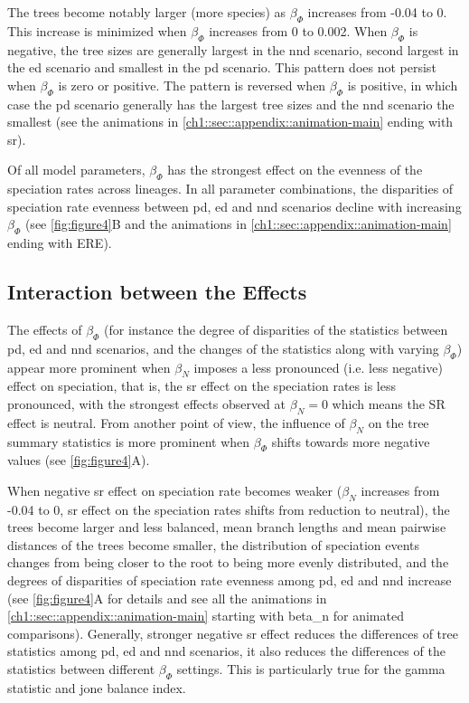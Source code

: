 {The trees become notably larger (more species) as $\beta_\varPhi$ increases from -0.04 to 0. This increase is minimized when $\beta_\varPhi$ increases from 0 to 0.002. When $\beta_\varPhi$ is negative, the tree sizes are generally largest in the \acrshort{nnd} scenario, second largest in the \acrshort{ed} scenario and smallest in the \acrshort{pd} scenario. This pattern does not persist when $\beta_\varPhi$ is zero or positive. The pattern is reversed when $\beta_\varPhi$ is positive, in which case the \acrshort{pd} scenario generally has the largest tree sizes and the \acrshort{nnd} scenario the smallest (see the animations in \autoref{ch1::sec::appendix::animation-main} ending with \acrshort{sr}).

Of all model parameters, $\beta_\varPhi$ has the strongest effect on the evenness of the speciation rates across lineages. In all parameter combinations, the disparities of speciation rate evenness between \acrshort{pd}, \acrshort{ed} and \acrshort{nnd} scenarios decline with increasing $\beta_\varPhi$ (see \autoref{fig:figure4}B and the animations in \autoref{ch1::sec::appendix::animation-main} ending with ERE). 

\subsection{Interaction between the Effects}
\label{ch1::sec::results::interaction_er_sr}
The effects of $\beta_\varPhi$ (for instance the degree of disparities of the statistics between \acrshort{pd}, \acrshort{ed} and \acrshort{nnd} scenarios, and the changes of the statistics along with varying $\beta_\varPhi$) appear more prominent when $\beta_N$ imposes a less pronounced (i.e. less negative) effect on speciation, that is, the \acrshort{sr} effect on the speciation rates is less pronounced, with the strongest effects observed at $\beta_N = 0$ which means the SR effect is neutral. From another point of view, the influence of $\beta_N$ on the tree summary statistics is more prominent when $\beta_\varPhi$ shifts towards more negative values (see \autoref{fig:figure4}A). 

When negative \acrshort{sr} effect on speciation rate becomes weaker ($\beta_N$ increases from -0.04 to 0, \acrshort{sr} effect on the speciation rates shifts from reduction to neutral), the trees become larger and less balanced, mean branch lengths and mean pairwise distances of the trees become smaller, the distribution of speciation events changes from being closer to the root to being more evenly distributed, and the degrees of disparities of speciation rate evenness among \acrshort{pd}, \acrshort{ed} and \acrshort{nnd} increase (see \autoref{fig:figure4}A for details and see all the animations in \autoref{ch1::sec::appendix::animation-main} starting with beta\_n for animated comparisons). Generally, stronger negative \acrshort{sr} effect reduces the differences of tree statistics among \acrshort{pd}, \acrshort{ed} and \acrshort{nnd} scenarios, it also reduces the differences of the statistics between different $\beta_\varPhi$ settings. This is particularly true for the \acrshort{gamma} statistic and \acrshort{jone} balance index.

}
